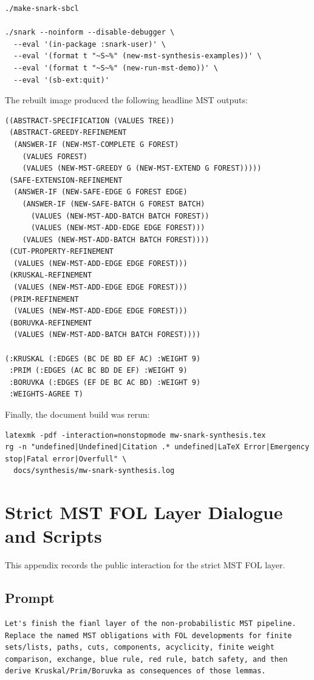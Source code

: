\documentclass[runningheads]{llncs}
\begin{document}
\begin{lstlisting}
./make-snark-sbcl

./snark --noinform --disable-debugger \
  --eval '(in-package :snark-user)' \
  --eval '(format t "~S~%" (new-mst-synthesis-examples))' \
  --eval '(format t "~S~%" (new-run-mst-demo))' \
  --eval '(sb-ext:quit)'
\end{lstlisting}
The rebuilt image produced the following headline MST outputs:
\begin{lstlisting}
((ABSTRACT-SPECIFICATION (VALUES TREE))
 (ABSTRACT-GREEDY-REFINEMENT
  (ANSWER-IF (NEW-MST-COMPLETE G FOREST)
    (VALUES FOREST)
    (VALUES (NEW-MST-GREEDY G (NEW-MST-EXTEND G FOREST)))))
 (SAFE-EXTENSION-REFINEMENT
  (ANSWER-IF (NEW-SAFE-EDGE G FOREST EDGE)
    (ANSWER-IF (NEW-SAFE-BATCH G FOREST BATCH)
      (VALUES (NEW-MST-ADD-BATCH BATCH FOREST))
      (VALUES (NEW-MST-ADD-EDGE EDGE FOREST)))
    (VALUES (NEW-MST-ADD-BATCH BATCH FOREST))))
 (CUT-PROPERTY-REFINEMENT
  (VALUES (NEW-MST-ADD-EDGE EDGE FOREST)))
 (KRUSKAL-REFINEMENT
  (VALUES (NEW-MST-ADD-EDGE EDGE FOREST)))
 (PRIM-REFINEMENT
  (VALUES (NEW-MST-ADD-EDGE EDGE FOREST)))
 (BORUVKA-REFINEMENT
  (VALUES (NEW-MST-ADD-BATCH BATCH FOREST))))

(:KRUSKAL (:EDGES (BC DE BD EF AC) :WEIGHT 9)
 :PRIM (:EDGES (AC BC BD DE EF) :WEIGHT 9)
 :BORUVKA (:EDGES (EF DE BC AC BD) :WEIGHT 9)
 :WEIGHTS-AGREE T)
\end{lstlisting}
Finally, the document build was rerun:
\begin{lstlisting}
latexmk -pdf -interaction=nonstopmode mw-snark-synthesis.tex
rg -n "undefined|Undefined|Citation .* undefined|LaTeX Error|Emergency stop|Fatal error|Overfull" \
  docs/synthesis/mw-snark-synthesis.log
\end{lstlisting}

\section{Strict MST FOL Layer Dialogue and Scripts}

This appendix records the public interaction for the strict MST FOL layer.

\subsection{Prompt}

\begin{lstlisting}
Let's finish the fianl layer of the non-probabilistic MST pipeline. Replace the named MST obligations with FOL developments for finite sets/lists, paths, cuts, components, acyclicity, finite weight comparison, exchange, blue rule, red rule, batch safety, and then derive Kruskal/Prim/Boruvka as consequences of those lemmas.
\end{lstlisting}
\end{document}
